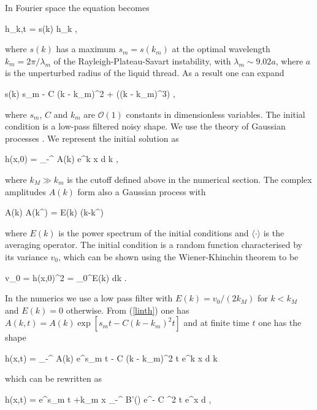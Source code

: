 \newcommand\hhh{\hat h}

In Fourier space the equation becomes

\be
\hhh_{k,t} = s(k) \hhh_k \label{linth} ,
\nd

where $s(k)$ has a maximum $s_m = s(k_m)$ at the optimal wavelength $k_m = 2\pi/\lambda_m$ of
the Rayleigh-Plateau-Savart instability, with $\lambda_m \sim 9.02 a$, where $a$ is the unperturbed
radius of the liquid thread.
As a result one can expand

\be
s(k) \simeq s_m -  C (k - k_m)^2 + ((k - k_m)^3) , 
\nd

where $s_m$, $C$ and $k_m$ are $\mathcal{O}(1)$ constants in dimensionless variables.
The initial condition is a low-pass filtered noisy shape. We use the theory of
Gaussian processes .
We represent the initial solution as

\be
h(x,0) = \int_{-\infty}^{\infty}  A(k) e^{\ii k x} {\textrm{d}} k , 
\nd

where $k_M \gg k_m$ is the cutoff defined above in the numerical section. 
The complex amplitudes $A(k)$ form also a Gaussian process \cite{monin1971statistical} with

\be
\langle A(k) \overline A(k^\prime) \rangle =  E(k) \delta(k-k^\prime)
\nd

where $E(k)$ is the power spectrum of the initial conditions and
$\langle \cdot \rangle$ is the averaging operator. 
The initial condition is a random function characterised by its variance 
$v_0$, which can be shown using the Wiener-Khinchin theorem to be 

\be
v_0 = \langle h(x,0)^2 \rangle = \int_0^\infty E(k) {\textrm{d}}k . 
\nd

In the numerics we use a low pass filter
with $E(k)= v_0/(2k_M)$ for $k<k_M$ and $E(k)=0$ otherwise. 
From (\ref{linth}) one has $A(k,t) = A(k) \exp[ s_m t -  C (k - k_m)^2 t]$ and 
at finite time $t$ one has the shape

\be
h(x,t) = \int_{-\infty}^{\infty}  A(k) e^{s_m t -  C (k - k_m)^2 t}  e^{\ii k x} {\textrm{d}} k
\nd

which can be rewritten as 

\be
h(x,t) =  e^{s_m t +\ii k_m x} \int_{-\infty}^{\infty}  B'(\kappa) e^{-  C \kappa^2 t}  e^{\ii \kappa x} {\textrm{d}} \kappa ,
\nd

